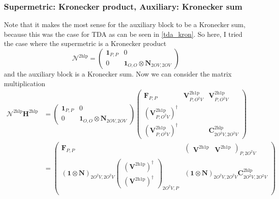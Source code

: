 \subsubsection{Supermetric: Kronecker product, Auxiliary: Kronecker sum}
Note that it makes the most sense for the auxiliary block to be a Kronecker sum, because this was the case for TDA as can be seen in \ref{tda_kron}. So here, I tried the case where the supermetric is a Kronecker product
\begin{equation}
    \bm{\mathcal{N}}^{2 \mathrm{hlp}} = \begin{pmatrix}
        \bm{1}_{P,P} & 0 \\
        0 & \bm{1}_{O,O} \otimes \bm{N}_{2OV,2OV}
    \end{pmatrix}
\end{equation}
and the auxiliary block is a Kronecker sum.
Now we can consider the matrix multiplication
\begin{align}
    \bm{\mathcal{N}}^{2 \mathrm{hlp}} \bm{H}^{2 \mathrm{hlp}} &= \begin{pmatrix}
        \bm{1}_{P,P} & 0 \\
        0 & \bm{1}_{O,O} \otimes \bm{N}_{2OV,2OV}
    \end{pmatrix}
    \begin{pmatrix}
        \bm{F}_{P,P} & \bm{V}^{2\mathrm{h1p}}_{P,O^2V} & \bm{V}^{2\mathrm{h1p}}_{P,O^2V} \\
        \left(\bm{V}^{2\mathrm{h1p}}_{P,O^2V}\right)^{\dagger} &  &  \\
        \left(\bm{V}^{2\mathrm{h1p}}_{P,O^2V}\right)^{\dagger} &  & \bm{C}^{2\mathrm{hlp}}_{2O^2V,2O^2V}
    \end{pmatrix} \\
&= \begin{pmatrix}
        \bm{F}_{P,P} & \begin{pmatrix} \bm{V}^{2\mathrm{h1p}} & \bm{V}^{2\mathrm{h1p}}\end{pmatrix}_{P,2O^2V} \\
        \left( \bm{1} \otimes \bm{N} \right)_{2O^2V,2O^2V}\begin{pmatrix} \left(\bm{V}^{2\mathrm{h1p}}\right)^{\dagger} \\ \left( \bm{V}^{2\mathrm{h1p}}\right)^{\dagger} \end{pmatrix}_{2O^2V,P} &   \left( \bm{1} \otimes \bm{N} \right)_{2O^2V,2O^2V} \bm{C}^{2\mathrm{hlp}}_{2O^2V,2O^2V}  \\
    \end{pmatrix} \\
\end{align}
